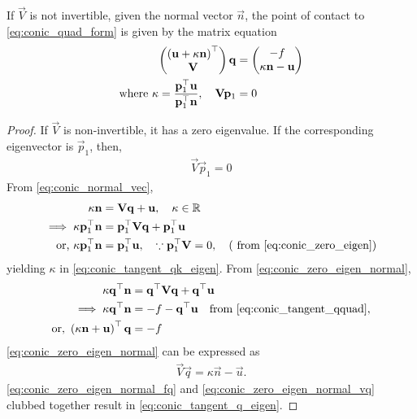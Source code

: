 \begin{theorem}
	\label{eq:conic-p-contact-parab}
  If $\vec{V}$ is not invertible,  given the normal vector $\vec{n}$, the point of contact to \eqref{eq:conic_quad_form} is given by the matrix equation
\begin{align}
\label{eq:conic_tangent_q_eigen}
\begin{pmatrix}
\mathbf{\left(u+\kappa \mathbf{n}\right)}^{\top} \\ \mathbf{V}
\end{pmatrix}
\mathbf{q} &= 
\begin{pmatrix}
-f
\\
\kappa\mathbf{n}-\mathbf{u}
\end{pmatrix}
\\
\text{where }  \kappa = \frac{\mathbf{p}_1^{\top}\mathbf{u}}{\mathbf{p}_1^{\top}\mathbf{n}}, \quad \mathbf{V}\mathbf{p}_1 &= 0
\label{eq:conic_tangent_qk_eigen}
\end{align}

\end{theorem}
\begin{proof}
  If $\vec{V}$ is non-invertible, it has a zero eigenvalue.  If the corresponding eigenvector is $\vec{p}_1$, then,
\begin{align}
\vec{V}\vec{p}_1 = 0
\label{eq:conic_zero_eigen}
\end{align}
From \eqref{eq:conic_normal_vec},
\begin{align}
\label{eq:conic_zero_eigen_normal}
\kappa \mathbf{n} &= \mathbf{V} \mathbf{q}+\mathbf{u}, \quad \kappa \in \mathbb{R}
\\
\implies \kappa \mathbf{p}_1^{\top}\mathbf{n} &= \mathbf{p}_1^{\top}\mathbf{V} \mathbf{q}+\mathbf{p}_1^{\top}\mathbf{u}
\\
\text{or, } \kappa \mathbf{p}_1^{\top}\mathbf{n} &= \mathbf{p}_1^{\top}\mathbf{u},  \quad \because \mathbf{p}_1^{\top} \mathbf{V} = 0, 
\quad 
\left(\text{ from } \eqref{eq:conic_zero_eigen}\right)
\end{align}
yielding $\kappa$ in \eqref{eq:conic_tangent_qk_eigen}. From \eqref{eq:conic_zero_eigen_normal},
\begin{align}
\kappa \mathbf{q}^{\top}\mathbf{n} &= \mathbf{q}^{\top}\mathbf{V} \mathbf{q}+\mathbf{q}^{\top}\mathbf{u}
\\
\implies \kappa \mathbf{q}^{\top}\mathbf{n} &= -f-\mathbf{q}^{\top}\mathbf{u} \quad \text{from } \eqref{eq:conic_tangent_qquad},
\\
\text{or, } \left(\kappa \mathbf{n}+\mathbf{u}\right)^{\top}\mathbf{q} &= -f
\label{eq:conic_zero_eigen_normal_fq}
\end{align}
\eqref{eq:conic_zero_eigen_normal} can be expressed as
\begin{align}
\label{eq:conic_zero_eigen_normal_vq}
\vec{V} \vec{q} = \kappa \vec{n} - \vec{u}.
\end{align}
\eqref{eq:conic_zero_eigen_normal_fq} and \eqref{eq:conic_zero_eigen_normal_vq} clubbed together result in \eqref{eq:conic_tangent_q_eigen}.
\end{proof}
